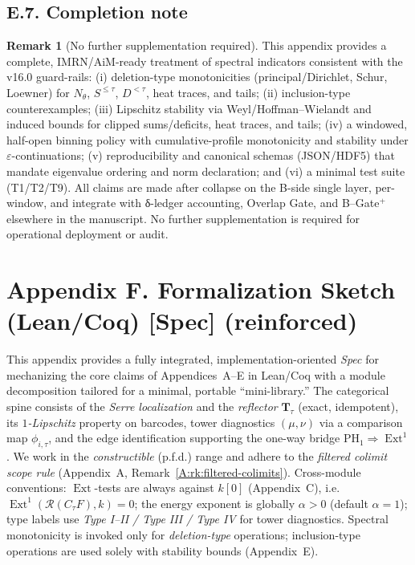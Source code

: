 \documentclass[11pt]{article}
\numberwithin{equation}{section}
\theoremstyle{plain}
\theoremstyle{definition}
\theoremstyle{remark}
\DeclareMathOperator{\Ext}{Ext}
\theoremstyle{plain}
\theoremstyle{definition}
\numberwithin{equation}{section}
\theoremstyle{definition}
\newtheorem{remark}[theorem]{Remark}
\numberwithin{equation}{section}
\theoremstyle{plain}
\theoremstyle{definition}
\theoremstyle{remark}
\begin{document}
\subsection*{E.7. Completion note}

\begin{remark}[No further supplementation required]
This appendix provides a complete, IMRN/AiM-ready treatment of spectral indicators consistent with the v16.0 guard-rails: (i) deletion-type monotonicities (principal/Dirichlet, Schur, Loewner) for \(N_\theta\), \(S^{\le\tau}\), \(D^{<\tau}\), heat traces, and tails; (ii) inclusion-type counterexamples; (iii) Lipschitz stability via Weyl/Hoffman–Wielandt and induced bounds for clipped sums/deficits, heat traces, and tails; (iv) a windowed, half-open binning policy with cumulative-profile monotonicity and stability under \(\varepsilon\)-continuations; (v) reproducibility and canonical schemas (JSON/HDF5) that mandate eigenvalue ordering and norm declaration; and (vi) a minimal test suite (T1/T2/T9).
All claims are made after collapse on the B-side single layer, per-window, and integrate with δ-ledger accounting, Overlap Gate, and B–Gate\(^{+}\) elsewhere in the manuscript. No further supplementation is required for operational deployment or audit.
\end{remark}



\section*{Appendix F. Formalization Sketch (Lean/Coq) [Spec] (reinforced)}

This appendix provides a fully integrated, implementation-oriented \emph{Spec} for mechanizing the core claims of
Appendices~A–E in Lean/Coq with a module decomposition tailored for a minimal, portable ``mini-library.''
The categorical spine consists of the \emph{Serre localization} and the \emph{reflector} \(\mathbf{T}_\tau\) (exact, idempotent),
its \emph{$1$-Lipschitz} property on barcodes, tower diagnostics \((\mu,\nu)\) via a comparison map \(\phi_{i,\tau}\),
and the edge identification supporting the one-way bridge \(\mathrm{PH}_1\Rightarrow\Ext^1\).
We work in the \emph{constructible} (p.f.d.) range and adhere to the \emph{filtered colimit scope rule}
(Appendix~A, Remark~\ref{A:rk:filtered-colimits}).
Cross-module conventions: \(\Ext\)-tests are always against \(k[0]\) (Appendix~C), i.e.\ \(\Ext^1(\mathcal{R}(C_\tau F),k)=0\);
the energy exponent is globally \(\alpha>0\) (default \(\alpha=1\));
type labels use \emph{Type I--II / Type III / Type IV} for tower diagnostics.
Spectral monotonicity is invoked only for \emph{deletion-type} operations; inclusion-type operations are used solely with stability bounds (Appendix~E).
\end{document}
